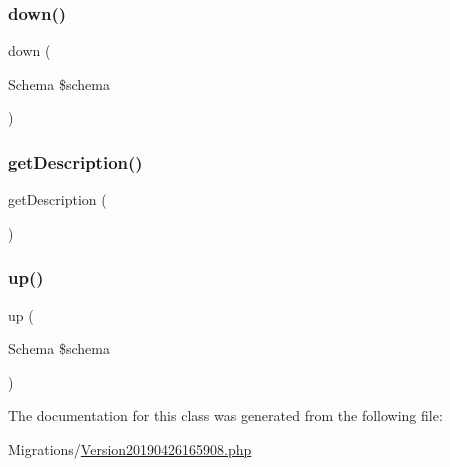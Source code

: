 \subsubsection{\texorpdfstring{down()}{down()}}
{\footnotesize\ttfamily down (\begin{DoxyParamCaption}\item[{Schema}]{\$schema }\end{DoxyParamCaption})}

\mbox{\label{class_doctrine_migrations_1_1_version20190426165908_a2e7bb35c71bf1824456ceb944cb7a845}} 
\subsubsection{\texorpdfstring{getDescription()}{getDescription()}}
{\footnotesize\ttfamily get\+Description (\begin{DoxyParamCaption}{ }\end{DoxyParamCaption})}

\mbox{\label{class_doctrine_migrations_1_1_version20190426165908_a23eb1c1428e8ea2ab2cf798fc06ec421}} 
\subsubsection{\texorpdfstring{up()}{up()}}
{\footnotesize\ttfamily up (\begin{DoxyParamCaption}\item[{Schema}]{\$schema }\end{DoxyParamCaption})}



The documentation for this class was generated from the following file\+:\begin{DoxyCompactItemize}
\item 
Migrations/\mbox{\hyperlink{_version20190426165908_8php}{Version20190426165908.\+php}}\end{DoxyCompactItemize}
